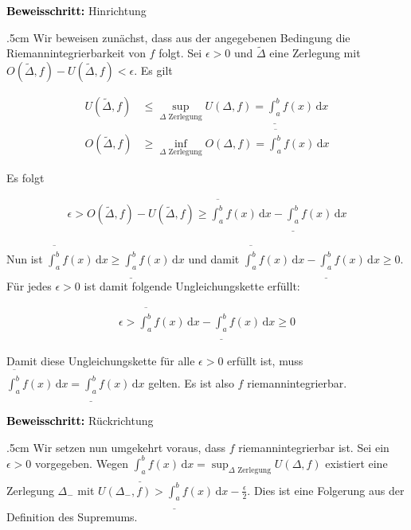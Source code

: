 \documentclass[fontsize=9pt,
               parskip=half-,
               DIV=14,
               listof=chapterentry,
               tocflat]{scrbook}
\newenvironment{indentblock}{\begin{adjustwidth}{.5cm}{}}{\end{adjustwidth}}
\newcommand{\proofstep}[1]{\textbf{\textcolor{Black}{#1}}}
\begin{document}
\begin{proof*}
\proofstep{Beweisschritt:}
 Hinrichtung\begin{indentblock}
Wir beweisen zunächst, dass aus der angegebenen Bedingung die Riemannintegrierbarkeit von $f$ folgt. Sei $\epsilon >0$ und ${\tilde {\Delta }}$ eine Zerlegung mit $O({\tilde {\Delta }},f)-U({\tilde {\Delta }},f)<\epsilon $. Es gilt

\begin{align*}
U({\tilde {\Delta }},f)&\leq \sup _{\Delta {\text{ Zerlegung}}}U(\Delta ,f)={\underline {\int _{a}^{b}}}f(x)\,\mathrm {d} x\\[0.3em]O({\tilde {\Delta }},f)&\geq \inf _{\Delta {\text{ Zerlegung}}}O(\Delta ,f)={\overline {\int _{a}^{b}}}f(x)\,\mathrm {d} x
\end{align*}

Es folgt

\begin{align*}
\epsilon >O({\tilde {\Delta }},f)-U({\tilde {\Delta }},f)\geq {\overline {\int _{a}^{b}}}f(x)\,\mathrm {d} x-{\underline {\int _{a}^{b}}}f(x)\,\mathrm {d} x
\end{align*}

Nun ist ${\overline {\int _{a}^{b}}}f(x)\,\mathrm {d} x\geq {\underline {\int _{a}^{b}}}f(x)\,\mathrm {d} x$ und damit ${\overline {\int _{a}^{b}}}f(x)\,\mathrm {d} x-{\underline {\int _{a}^{b}}}f(x)\,\mathrm {d} x\geq 0$. Für jedes $\epsilon >0$ ist damit folgende Ungleichungskette erfüllt:

\begin{align*}
\epsilon >{\overline {\int _{a}^{b}}}f(x)\,\mathrm {d} x-{\underline {\int _{a}^{b}}}f(x)\,\mathrm {d} x\geq 0
\end{align*}

Damit diese Ungleichungskette für alle $\epsilon >0$ erfüllt ist, muss ${\overline {\int _{a}^{b}}}f(x)\,\mathrm {d} x={\underline {\int _{a}^{b}}}f(x)\,\mathrm {d} x$ gelten. Es ist also $f$ riemannintegrierbar.

\end{indentblock}

\proofstep{Beweisschritt:}
 Rückrichtung\begin{indentblock}
Wir setzen nun umgekehrt voraus, dass $f$ riemannintegrierbar ist. Sei ein $\epsilon >0$ vorgegeben. Wegen ${\underline {\int _{a}^{b}}}f(x)\,\mathrm {d} x=\sup _{\Delta {\text{ Zerlegung}}}U(\Delta ,f)$ existiert eine Zerlegung $\Delta _{-}$ mit $U(\Delta _{-},f)>{\underline {\int _{a}^{b}}}f(x)\,\mathrm {d} x-{\tfrac {\epsilon }{2}}$. Dies ist eine Folgerung aus der Definition des Supremums.


\end{indentblock}
\end{proof*}
\end{document}
